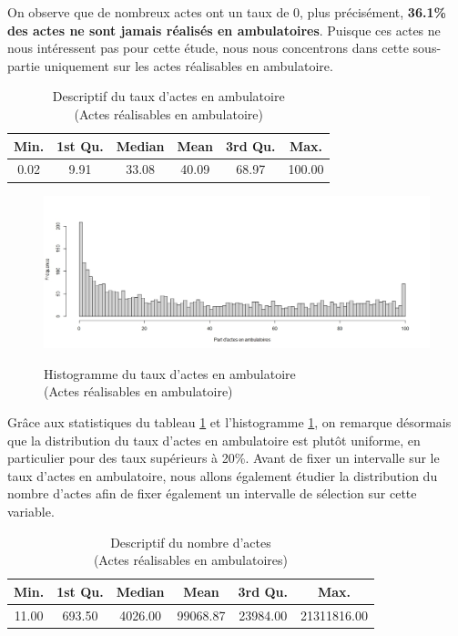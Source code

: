 On observe que de nombreux actes ont un taux de 0, plus précisément, \textbf{36.1\% des actes ne sont jamais réalisés en ambulatoires}. Puisque ces actes ne nous intéressent pas pour cette étude, nous nous concentrons dans cette sous-partie uniquement sur les actes réalisables en ambulatoire.\\


\begin{table}[!ht]
\centering
\caption{Descriptif du taux d'actes en ambulatoire\\(Actes réalisables en ambulatoire)} 
\label{stat_part_AReA}
\begin{tabular}{cccccc}
  \hline
Min. & 1st Qu. & Median & Mean & 3rd Qu. & Max. \\ 
  \hline
0.02 & 9.91 & 33.08 & 40.09 & 68.97 & 100.00 \\  
   \hline
\end{tabular}
\end{table}

\bigskip


\begin{figure}[!ht]
    \centering
    \caption{Histogramme du taux d'actes en ambulatoire \\(Actes réalisables en ambulatoire)}
    \includegraphics[scale=0.5]{Images/hist_part_ambu_non_nul.jpeg}
    \label{hist_part_ambu_non_nul}
\end{figure}

Grâce aux statistiques du tableau \ref{stat_part_AReA} et l'histogramme \ref{hist_part_ambu_non_nul}, on remarque désormais que la distribution du taux d'actes en ambulatoire est plutôt uniforme, en particulier pour des taux supérieurs à 20\%. Avant de fixer un intervalle sur le taux d'actes en ambulatoire, nous allons également étudier la distribution du nombre d'actes afin de fixer également un intervalle de sélection sur cette variable.\\



\begin{table}[!ht]
\centering
\caption{Descriptif du nombre d'actes\\(Actes réalisables en ambulatoires)} 
\begin{tabular}{cccccc}
  \hline
Min. & 1st Qu. & Median & Mean & 3rd Qu. & Max. \\ 
  \hline
11.00 & 693.50 & 4026.00 & 99068.87 & 23984.00 & 21311816.00 \\ 
   \hline
\end{tabular}
\end{table}



